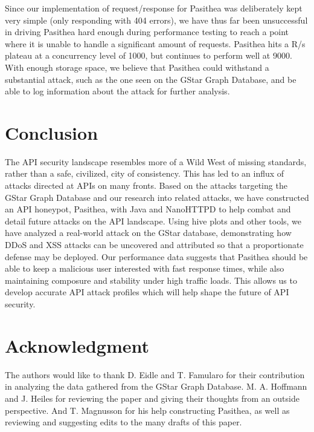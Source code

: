 Since our implementation of request/response for Pasithea was deliberately kept very simple (only responding with 404 errors), we have thus far been unsuccessful in driving Pasithea hard enough during performance testing to reach a point where it is unable to handle a significant amount of requests.  Pasithea hits a R/s plateau at a concurrency level of 1000, but continues to perform well at 9000. With enough storage space, we believe that Pasithea could withstand a substantial attack, such as the one seen on the GStar Graph Database, and be able to log information about the attack for further analysis.

\section{Conclusion}
\label{conclusion}
The API security landscape resembles more of a Wild West of missing standards, rather than a safe, civilized, city of consistency. This has led to an influx of attacks directed at APIs on many  fronts. Based on the attacks targeting the GStar Graph Database and our research into related attacks, we have constructed an API honeypot, Pasithea, with Java and NanoHTTPD to help combat and detail future attacks on the API landscape. Using hive plots and other tools, we have analyzed a real-world attack on the GStar database, demonstrating how DDoS and XSS attacks can be uncovered and attributed so that a proportionate defense may be deployed.  Our performance data suggests that Pasithea should be able to keep a malicious user interested with fast response times, while also maintaining composure and stability under high traffic loads. This allows us to develop accurate API attack profiles which will help shape the future of API security.

\section*{Acknowledgment}
\label{Acknowledgements}
The authors would like to thank D. Eidle and T. Famularo for their contribution in analyzing the data gathered from the GStar Graph Database.  M. A. Hoffmann and J. Heiles for reviewing the paper and giving their thoughts from an outside perspective. And T. Magnusson for his help constructing Pasithea, as well as reviewing and suggesting edits to the many drafts of this paper.


\ifCLASSOPTIONcaptionsoff
  \newpage
\fi


